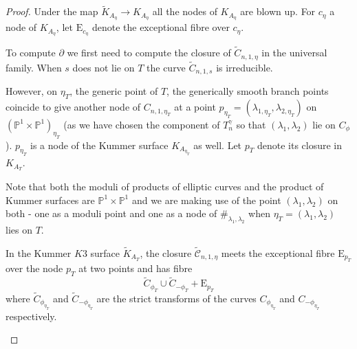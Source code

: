 \documentclass[11pt,a4paper]{article}
\newcommand {\CP}{{\mathds P}}
\newcommand {\RE}{{{\mathrm E}}}
\newcommand {\TCC}{\tilde{\mathcal C}}
\newcommand {\TK}{{\tilde{K}}}
\newcommand {\lb}{{\lambda}}
\newcommand {\CPP}{\CP^1 \times \CP^1}
\newcommand{\TC}{\tilde{C}}
\begin{document}
\begin{proof} Under the map $\TK_{A_{\eta}}\longrightarrow K_{A_{\eta}}$ all the nodes of $K_{A_{\eta}}$ are blown up. For $c_{\eta}$ a node of $K_{A_{\eta}}$, let ${\mathrm E}_{c_{\eta}}$ denote the exceptional fibre over $c_{\eta}$.
	
To compute $\partial$ we first need to compute the closure of $\TC_{n,1,\eta}$ in the universal family. When $s$ does not lie on $T$ the curve $\TC_{n,1,s}$ is irreducible. 

However, on $\eta_T$, the generic point of $T$, the generically smooth branch points coincide to give another node of $C_{n,1,\eta_T}$ at a point $p_{\eta_T}=(\lb_{1,\eta_T},\lb_{2,\eta_T})$ on $(\CPP)_{\eta_T}$ (as we have chosen the component of $T_n^{\gamma}$ so that $(\lb_1,\lb_2)$ lie on $C_{\phi}$).  $p_{\eta_T}$ is a node of the Kummer surface $K_{A_{\eta_T}}$ as well. Let $p_T$ denote its closure in $K_{A_T}$.  

Note that both the moduli of products of elliptic curves and the product of Kummer surfaces are $\CPP$ and we are making use of the point $(\lb_1,\lb_2)$ on both - one as a moduli point and one as a node of $\#_{\lb_1,\lb_2}$ when $\eta_T=(\lb_1,\lb_2)$ lies on $T$. 

In the  Kummer $K3$ surface $\TK_{A_T}$, the closure $\TCC_{n,1,\eta}$  meets the exceptional fibre $\RE_{p_T}$ over the node $p_T$ at two points and has fibre 
%
$$\TC_{\phi_T} \cup \TC_{-\phi_T} + \RE_{p_T} $$
%
where $\TC_{\phi_{\eta_T}}$ and $\TC_{-\phi_{\eta_T}}$ are the strict transforms of the curves $C_{\phi_{\eta_T}}$ and $C_{-\phi_{\eta_T}}$ respectively.


\begin{center}
	
\end{center}
\end{proof}
\end{document}
